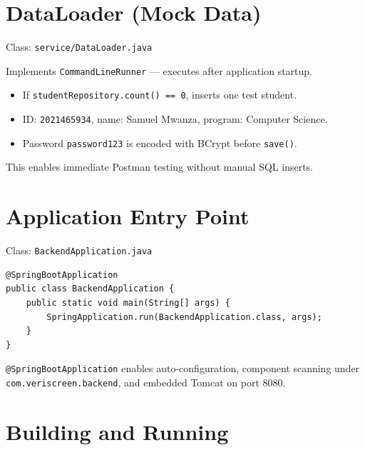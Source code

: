 \documentclass[11pt,a4paper]{article}
\begin{document}
\section{DataLoader (Mock Data)}

Class: \texttt{service/DataLoader.java}

Implements \texttt{CommandLineRunner} --- executes after application startup.

\begin{itemize}[noitemsep]
    \item If \texttt{studentRepository.count() == 0}, inserts one test student.
    \item ID: \texttt{2021465934}, name: Samuel Mwanza, program: Computer Science.
    \item Password \texttt{password123} is encoded with BCrypt before \texttt{save()}.
\end{itemize}

This enables immediate Postman testing without manual SQL inserts.

\section{Application Entry Point}

Class: \texttt{BackendApplication.java}

\begin{lstlisting}[style=javacode, caption={Main class}]
@SpringBootApplication
public class BackendApplication {
    public static void main(String[] args) {
        SpringApplication.run(BackendApplication.class, args);
    }
}
\end{lstlisting}

\texttt{@SpringBootApplication} enables auto-configuration, component scanning under \texttt{com.veriscreen.backend}, and embedded Tomcat on port 8080.

\section{Building and Running}
\end{document}
